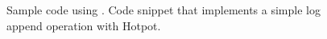 {
\begin{figure}[th]
\begin{center}
\scriptsize

\caption[Sample code using \hotpot.]{Sample code using \hotpot. Code snippet that implements a simple log append operation with Hotpot.}
\label{fig-code-eg}
\end{center}
\end{figure}
}
